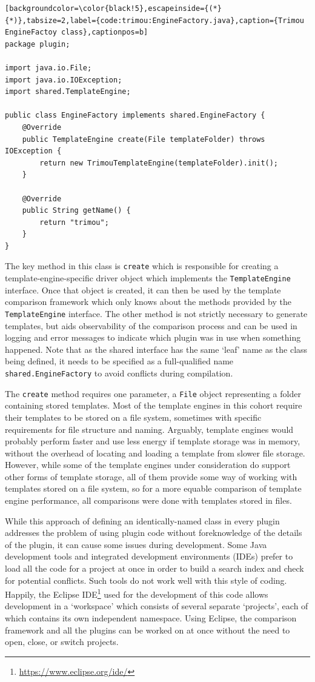 \begin{lstlisting}[backgroundcolor=\color{black!5},escapeinside={(*}{*)},tabsize=2,label={code:trimou:EngineFactory.java},caption={Trimou EngineFactoy class},captionpos=b]
package plugin;

import java.io.File;
import java.io.IOException;
import shared.TemplateEngine;

public class EngineFactory implements shared.EngineFactory {
    @Override
    public TemplateEngine create(File templateFolder) throws IOException {
        return new TrimouTemplateEngine(templateFolder).init();
    }

    @Override
    public String getName() {
        return "trimou";
    }
}
\end{lstlisting}

The key method in this class is \verb!create! which is responsible for creating a template-engine-specific driver object which implements the \verb!TemplateEngine! interface. Once that object is created, it can then be used by the template comparison framework which only knows about the methods provided by the \verb!TemplateEngine! interface. The other method is not strictly necessary to generate templates, but aids observability of the comparison process and can be used in logging and error messages to indicate which plugin was in use when something happened. Note that as the shared interface has the same `leaf' name as the class being defined, it needs to be specified as a full-qualified name \verb!shared.EngineFactory! to avoid conflicts during compilation.

The \verb!create! method requires one parameter, a \verb!File! object representing a folder containing stored templates. Most of the template engines in this cohort require their templates to be stored on a file system, sometimes with specific requirements for file structure and naming. Arguably, template engines would probably perform faster and use less energy if template storage was in memory, without the overhead of locating and loading a template from slower file storage. However, while some of the template engines under consideration do support other forms of template storage, all of them provide some way of working with templates stored on a file system, so for a more equable comparison of template engine performance, all comparisons were done with templates stored in files.

While this approach of defining an identically-named class in every plugin addresses the problem of using plugin code without foreknowledge of the details of the plugin, it can cause some issues during development. Some Java development tools and integrated development environments (IDEs) prefer to load all the code for a project at once in order to build a search index and check for potential conflicts. Such tools do not work well with this style of coding. Happily, the Eclipse IDE\footnote{\url{https://www.eclipse.org/ide/}} used for the development of this code allows development in a `workspace' which consists of several separate `projects', each of which contains its own independent namespace. Using Eclipse, the comparison framework and all the plugins can be worked on at once without the need to open, close, or switch projects.

